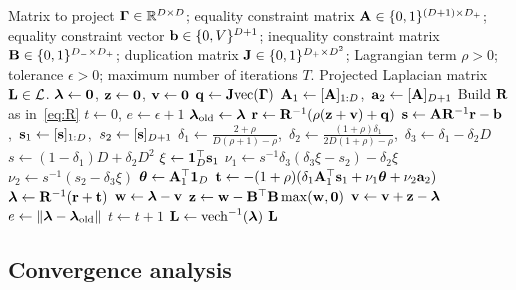 \begin{algorithm}[t]
	\caption{Laplacian Projection via ADMM}
	\label{alg:ladmm}
	\begin{algorithmic}[1]
		\renewcommand{\algorithmicrequire}{\textbf{Input:}}
		\renewcommand{\algorithmicensure}{\textbf{Output:}}
		\Require Matrix to project $\boldsymbol{\Gamma}\in\mathbb{R}^{D\times D}$; equality constraint matrix $\mathbf{A}\in\{0,1\}^{(D+1)\times D_+}$; equality constraint vector $\mathbf{b}\in\{0,V\}^{D+1}$; inequality constraint matrix $\mathbf{B}\in\{0,1\}^{D_-\times D_+}$; duplication matrix $\mathbf{J}\in\{0,1\}^{D_+\times D^2}$; Lagrangian term $\rho>0$; tolerance $\epsilon >0$; maximum number of iterations $T$.
		\Ensure Projected Laplacian matrix $\mathbf{L}\in\mathcal{L}$.
		\State $\boldsymbol{\lambda}\gets \mathbf{0}$, $\mathbf{z}\gets \mathbf{0}$, $\mathbf{v}\gets\mathbf{0}$
		\State $\mathbf{q}\gets \mathbf{J}\text{vec}(\boldsymbol{\Gamma})$
		\State $\mathbf{A}_1\gets [\mathbf{A}]_{1:D}$,\ $\mathbf{a}_2\gets[\mathbf{A}]_{D+1}$
		\State Build $\mathbf{R}$ as in~\eqref{eq:R}
		\State $t\gets 0$, $e\gets \epsilon + 1$
		\State $\boldsymbol{\lambda}_{\text{old}}\gets \boldsymbol{\lambda}$
		\State $\mathbf{r}\gets \mathbf{R}^{-1}(\rho(\mathbf{z}+\mathbf{v}) + \mathbf{q})$
		\State $\mathbf{s}\gets \mathbf{A}\mathbf{R}^{-1}\mathbf{r}-\mathbf{b}$,\ $\mathbf{s}_1\gets [\mathbf{s}]_{1:D}$,\ $s_2\gets [\mathbf{s}]_{D+1}$
		\State $\delta_1\gets \frac{2+\rho}{D(\rho+1)-\rho}$,\ $\delta_2\gets \frac{(1+\rho)\delta_1}{2D(1+\rho)-\rho}$,\ $\delta_3\gets \delta_1-\delta_2D$
		\State $s \gets (1 - \delta_1)D + \delta_2 D^2$
		\State $\xi\gets \mathbf{1}_D^\top\mathbf{s}_1$
		\State $\nu_{1}\gets s^{-1}\delta_3(\delta_3\xi-s_2) - \delta_2\xi$
		\State $\nu_{2}\gets s^{-1}(s_2 - \delta_3\xi)$
		\State $\boldsymbol{\theta}\gets\mathbf{A}_1^\top\mathbf{1}_D$
		\State $\mathbf{t} \gets -(1+\rho)(\delta_1\mathbf{A}_1^\top\mathbf{s}_1 + \nu_1\boldsymbol{\theta} + \nu_2\mathbf{a}_2)$
		\State $\boldsymbol{\lambda}\gets \mathbf{R}^{-1}(\mathbf{r}+\mathbf{t})$
		\State $\mathbf{w}\gets\boldsymbol{\lambda} - \mathbf{v}$
		\State $\mathbf{z} \gets \mathbf{w} - \mathbf{B}^\top\mathbf{B}\max(\mathbf{w},\mathbf{0})$
		\State $\mathbf{v} \gets \mathbf{v} + \mathbf{z} - \boldsymbol{\lambda}$
		\State $e\gets \left\|\boldsymbol{\lambda}-\boldsymbol{\lambda}_{\text{old}}\right\|$
		\State $t \gets t + 1$
		\EndWhile
		\State $\mathbf{L} \gets \text{vech}^{-1}(\boldsymbol{\lambda})$
		\Return $\mathbf{L}$ 
	\end{algorithmic} 
\end{algorithm}

\subsection{Convergence analysis}
\label{sec:conv_analysis}


